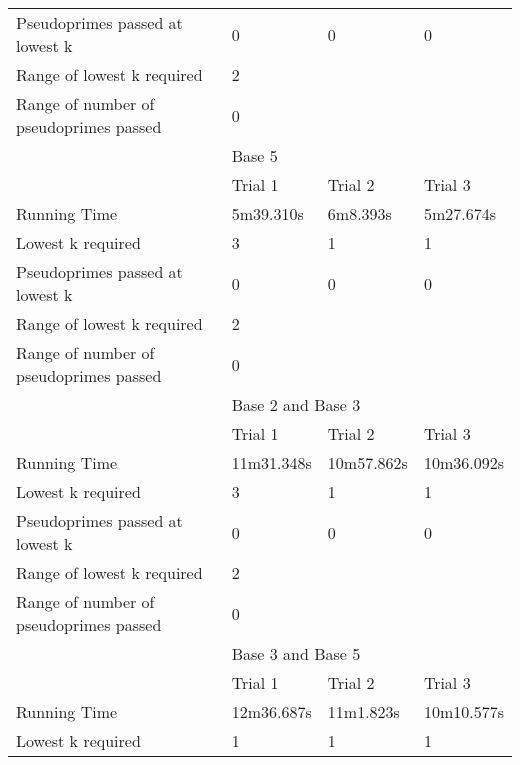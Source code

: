 \documentclass{article}
\begin{document}
\begin{appendices}
\begin{table}[h]
\begin{tabular}{@{}llll@{}}
Pseudoprimes passed at lowest k        & 0           & 0          & 0          \\\cmidrule(lr){2-4}
Range of lowest k required             & \multicolumn{3}{l}{2}                 \\
Range of number of pseudoprimes passed & \multicolumn{3}{l}{0}                 \\\midrule
                                       & \multicolumn{3}{l}{Base 5}            \\\midrule
                                       & Trial 1     & Trial 2    & Trial 3    \\
Running Time                           & 5m39.310s   & 6m8.393s   & 5m27.674s  \\
Lowest k required                      & 3           & 1          & 1          \\
Pseudoprimes passed at lowest k        & 0           & 0          & 0          \\\cmidrule(lr){2-4}
Range of lowest k required             & \multicolumn{3}{l}{2}                 \\
Range of number of pseudoprimes passed & \multicolumn{3}{l}{0}                 \\\midrule
                                       & \multicolumn{3}{l}{Base 2 and Base 3} \\\midrule
                                       & Trial 1     & Trial 2    & Trial 3    \\
Running Time                           & 11m31.348s  & 10m57.862s & 10m36.092s  \\
Lowest k required                      & 3           & 1          & 1          \\
Pseudoprimes passed at lowest k        & 0           & 0          & 0          \\\cmidrule(lr){2-4}
Range of lowest k required             & \multicolumn{3}{l}{2}                 \\
Range of number of pseudoprimes passed & \multicolumn{3}{l}{0}                 \\\midrule
                                       & \multicolumn{3}{l}{Base 3 and Base 5} \\\midrule
                                       & Trial 1     & Trial 2    & Trial 3    \\
Running Time                           & 12m36.687s  & 11m1.823s  & 10m10.577s \\
Lowest k required                      & 1           & 1          & 1          \\

\end{tabular}
\end{table}
\end{appendices}
\end{document}
